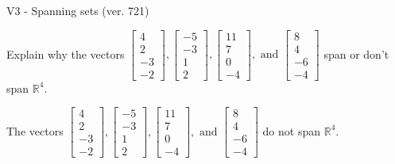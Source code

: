 \begin{exercise}
  \begin{exerciseTitle}V3 - Spanning sets (ver. 721)\end{exerciseTitle}
  \begin{exerciseStatement}
    Explain why the vectors \(\left[\begin{array}{r}
4 \\
2 \\
-3 \\
-2
\end{array}\right] , \left[\begin{array}{r}
-5 \\
-3 \\
1 \\
2
\end{array}\right] , \left[\begin{array}{r}
11 \\
7 \\
0 \\
-4
\end{array}\right] , \text{ and } \left[\begin{array}{r}
8 \\
4 \\
-6 \\
-4
\end{array}\right]\) span or don't span \(\mathbb{R}^4\). 
	


  \end{exerciseStatement}
  \begin{exerciseAnswer}
   The vectors \(\left[\begin{array}{r}
4 \\
2 \\
-3 \\
-2
\end{array}\right] , \left[\begin{array}{r}
-5 \\
-3 \\
1 \\
2
\end{array}\right] , \left[\begin{array}{r}
11 \\
7 \\
0 \\
-4
\end{array}\right] , \text{ and } \left[\begin{array}{r}
8 \\
4 \\
-6 \\
-4
\end{array}\right]\) 
  	 do not  
	span \(\mathbb{R}^4\).
  


  \end{exerciseAnswer}
\end{exercise}